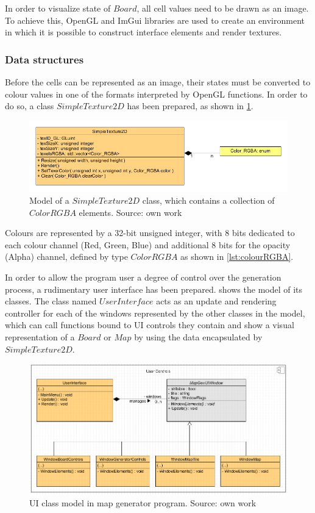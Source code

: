 \documentclass[12pt]{report}
\begin{document}
In order to visualize state of $Board$, all cell values need to be drawn as an image. To achieve this, OpenGL and ImGui libraries are used to create an environment in which it is possible to construct interface elements and render textures.    

\subsubsection{Data structures}

Before the cells can be represented as an image, their states must be converted to colour values in one of the formats interpreted by OpenGL functions. In order to do so, a class $SimpleTexture2D$ has been prepared, as shown in \cref{fig:texture}. 

\begin{figure}[h]
	\centering
	\includegraphics[width=0.9\linewidth]{diagrams/texture}
	\caption{Model of a $SimpleTexture2D$ class, which contains a collection of $Color RGBA$ elements. Source: own work}
	\label{fig:texture}
\end{figure}

Colours are represented by a 32-bit unsigned integer, with 8 bits dedicated to each colour channel (Red, Green, Blue) and additional 8 bits for the opacity (Alpha) channel, defined by type $Color RGBA$ as shown in \cref{lst:colourRGBA}. 



In order to allow the program user a degree of control over the generation process, a rudimentary user interface has been prepared.  shows the model of its classes. The class named $UserInterface$ acts as an update and rendering controller for each of the windows represented by the other classes in the model, which can call functions bound to UI controls they contain and show a visual representation of a $Board$ or $Map$ by using the data encapsulated by $SimpleTexture2D$.

\begin{figure}[h]
	\centering
	\includegraphics[width=0.8\linewidth]{diagrams/uiwindows}
	\caption[User Interface model]{UI class model in map generator program. Source: own work}
	\label{fig:uiwindows}
\end{figure}
\end{document}
